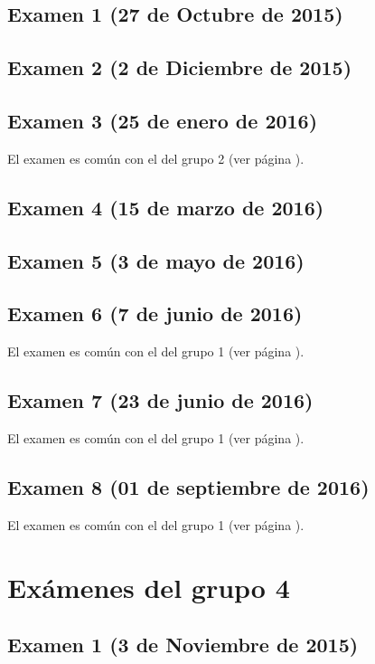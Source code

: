 \documentclass[a4paper,12pt,twoside]{book}
\begin{document}
\section{Examen 1 (27 de Octubre de 2015)}
\section{Examen 2 (2 de Diciembre de 2015)}
\section{Examen 3 (25 de enero de 2016)}
El examen es común con el del grupo 2 (ver página \pageref{examen_15_16_2_3}).
\section{Examen 4 (15 de marzo de 2016)}
\section{Examen 5 (3 de mayo de 2016)}
\section{Examen 6 (7 de junio de 2016)} 
El examen es común con el del grupo 1 (ver página \pageref{examen_15_16_1_6}).
\section{Examen 7 (23 de junio de 2016)}
El examen es común con el del grupo 1 (ver página \pageref{examen_15_16_1_7}).
\section{Examen 8 (01 de septiembre de 2016)}
El examen es común con el del grupo 1 (ver página \pageref{examen_15_16_1_8}).

\chapter{Exámenes del grupo 4}
\section{Examen 1 (3 de Noviembre de 2015)}
\end{document}
